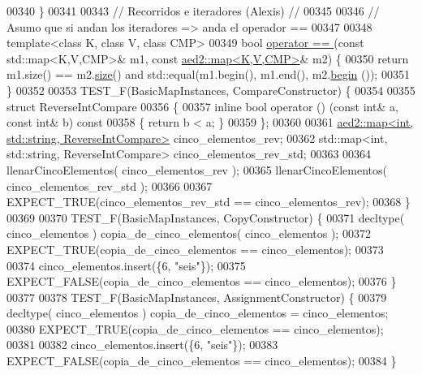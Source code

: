 \begin{DoxyCode}
00340 \}
00341 
00343 \textcolor{comment}{// Recorridos e iteradores (Alexis) //}
00345 \textcolor{comment}{}
00346 \textcolor{comment}{// Asumo que si andan los iteradores => anda el operador ==}
00347 
00348 \textcolor{keyword}{template}<\textcolor{keyword}{class} K, \textcolor{keyword}{class} V, \textcolor{keyword}{class} CMP>
00349 \textcolor{keywordtype}{bool} \hyperlink{classaed2_1_1map_abfc51b39670220e79037ac067006e933_abfc51b39670220e79037ac067006e933}{operator == }(\textcolor{keyword}{const} std::map<K,V,CMP>& m1, \textcolor{keyword}{const} \hyperlink{classaed2_1_1map}{aed2::map<K,V,CMP>}& m2) \{
00350     \textcolor{keywordflow}{return} m1.size() == m2.\hyperlink{classaed2_1_1map_a89f2613f926ac13293eafe65889d6021_a89f2613f926ac13293eafe65889d6021}{size}() and std::equal(m1.begin(), m1.end(), m2.\hyperlink{classaed2_1_1map_a58a95705d54b3dda7f775ce5a22225cb_a58a95705d54b3dda7f775ce5a22225cb}{begin}
      ());
00351 \}
00352 
00353 TEST\_F(BasicMapInstances, CompareConstructor) \{
00354 
00355     \textcolor{keyword}{struct }ReverseIntCompare
00356     \{
00357         \textcolor{keyword}{inline} \textcolor{keywordtype}{bool} operator () (\textcolor{keyword}{const} \textcolor{keywordtype}{int}& a, \textcolor{keyword}{const} \textcolor{keywordtype}{int}& b)\textcolor{keyword}{ const}
00358 \textcolor{keyword}{        }\{ \textcolor{keywordflow}{return} b < a; \}
00359     \};
00360 
00361     \hyperlink{classaed2_1_1map}{aed2::map<int, std::string, ReverseIntCompare>} cinco\_elementos\_rev;
00362     std::map<int, std::string, ReverseIntCompare> cinco\_elementos\_rev\_std;
00363 
00364     llenarCincoElementos( cinco\_elementos\_rev );
00365     llenarCincoElementos( cinco\_elementos\_rev\_std );
00366 
00367     EXPECT\_TRUE(cinco\_elementos\_rev\_std == cinco\_elementos\_rev);
00368 \}
00369 
00370 TEST\_F(BasicMapInstances, CopyConstructor) \{
00371     decltype( cinco\_elementos ) copia\_de\_cinco\_elementos( cinco\_elementos );
00372     EXPECT\_TRUE(copia\_de\_cinco\_elementos == cinco\_elementos);
00373 
00374     cinco\_elementos.insert(\{6, \textcolor{stringliteral}{"seis"}\});
00375     EXPECT\_FALSE(copia\_de\_cinco\_elementos == cinco\_elementos);
00376 \}
00377 
00378 TEST\_F(BasicMapInstances, AssignmentConstructor) \{
00379     decltype( cinco\_elementos ) copia\_de\_cinco\_elementos = cinco\_elementos;
00380     EXPECT\_TRUE(copia\_de\_cinco\_elementos == cinco\_elementos);
00381 
00382     cinco\_elementos.insert(\{6, \textcolor{stringliteral}{"seis"}\});
00383     EXPECT\_FALSE(copia\_de\_cinco\_elementos == cinco\_elementos);
00384 \}

\end{DoxyCode}
